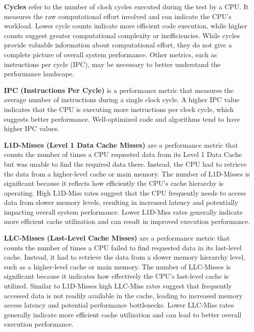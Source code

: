 \textbf{Cycles} refer to the number of clock cycles executed during the test by a CPU. It measures the raw computational effort involved and can indicate the CPU's workload. Lower cycle counts indicate more efficient code execution, while higher counts suggest greater computational complexity or inefficiencies. While cycles provide valuable information about computational effort, they do not give a complete picture of overall system performance. Other metrics, such as instructions per cycle (IPC), may be necessary to better understand the performance landscape.

\textbf{IPC (Instructions Per Cycle)} is a performance metric that measures the average number of instructions during a single clock cycle. A higher IPC value indicates that the CPU is executing more instructions per clock cycle, which suggests better performance. Well-optimized code and algorithms tend to have higher IPC values.

\textbf{L1D-Misses (Level 1 Data Cache Misses)} are a performance metric that counts the number of times a CPU requested data from its Level 1 Data Cache but was unable to find the required data there. Instead, the CPU had to retrieve the data from a higher-level cache or main memory. The number of L1D-Misses is significant because it reflects how efficiently the CPU's cache hierarchy is operating. High L1D-Miss rates suggest that the CPU frequently needs to access data from slower memory levels, resulting in increased latency and potentially impacting overall system performance. Lower L1D-Miss rates generally indicate more efficient cache utilization and can result in improved execution performance.

\textbf{LLC-Misses (Last-Level Cache Misses)} are a performance metric that counts the number of times a CPU failed to find requested data in its last-level cache. Instead, it had to retrieve the data from a slower memory hierarchy level, such as a higher-level cache or main memory. The number of LLC-Misses is significant because it indicates how effectively the CPU's last-level cache is utilized. Similar to L1D-Misses high LLC-Miss rates suggest that frequently accessed data is not readily available in the cache, leading to increased memory access latency and potential performance bottlenecks. Lower LLC-Miss rates generally indicate more efficient cache utilization and can lead to better overall execution performance.

